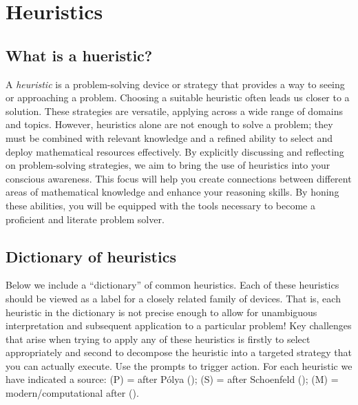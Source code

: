 \documentclass[
  a4paper,
  DIV=11,
  numbers=noendperiod,
  oneside]{scrreprt}
\begin{document}
\chapter{Heuristics}\label{sec-heuristics}

\section{What is a hueristic?}\label{what-is-a-hueristic}

A \emph{heuristic} is a problem-solving device or strategy that provides
a way to seeing or approaching a problem. Choosing a suitable heuristic
often leads us closer to a solution. These strategies are versatile,
applying across a wide range of domains and topics. However, heuristics
alone are not enough to solve a problem; they must be combined with
relevant knowledge and a refined ability to select and deploy
mathematical resources effectively. By explicitly discussing and
reflecting on problem-solving strategies, we aim to bring the use of
heuristics into your conscious awareness. This focus will help you
create connections between different areas of mathematical knowledge and
enhance your reasoning skills. By honing these abilities, you will be
equipped with the tools necessary to become a proficient and literate
problem solver.

\section{Dictionary of heuristics}\label{dictionary-of-heuristics}

Below we include a ``dictionary'' of common heuristics. Each of these
heuristics should be viewed as a label for a closely related family of
devices. That is, each heuristic in the dictionary is not precise enough
to allow for unambiguous interpretation and subsequent application to a
particular problem! Key challenges that arise when trying to apply any
of these heuristics is firstly to select appropriately and second to
decompose the heuristic into a targeted strategy that you can actually
execute. Use the prompts to trigger action. For each heuristic we have
indicated a source: (P) = after Pólya (); (S) = after Schoenfeld
(); (M) =
modern/computational after
().
\end{document}
